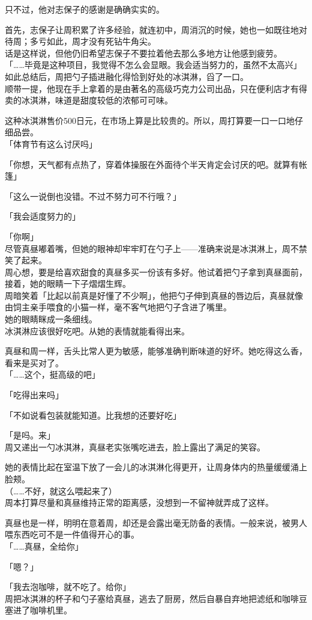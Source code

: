 只不过，他对志保子的感谢是确确实实的。

首先，志保子让周积累了许多经验，就连初中，周消沉的时候，她也一如既往地对待周；多亏如此，周才没有死钻牛角尖。\\

话是这样说，但他仍旧希望志保子不要拉着他去那么多地方让他感到疲劳。\\

「……毕竟是这种项目，我觉得不怎么会显眼。我会适当努力的，虽然不太高兴」\\

如此总结后，周把勺子插进融化得恰到好处的冰淇淋，舀了一口。\\

顺带一提，他现在手上拿着的是由著名的高级巧克力公司出品，只在便利店才有得卖的冰淇淋，味道是甜度较低的浓郁可可味。

这种冰淇淋售价500日元，在市场上算是比较贵的。所以，周打算要一口一口地仔细品尝。\\

「体育节有这么讨厌吗」

「你想，天气都有点热了，穿着体操服在外面待个半天肯定会讨厌的吧。就算有帐篷」

「这么一说倒也没错。不过不努力可不行哦？」

「我会适度努力的」

「你啊」\\

尽管真昼嘟着嘴，但她的眼神却牢牢盯在勺子上——准确来说是冰淇淋上，周不禁笑了起来。\\

周心想，要是给喜欢甜食的真昼多买一份该有多好。他试着把勺子拿到真昼面前，接着，她的眼睛一下子熠熠生辉。\\

周暗笑着「比起以前真是好懂了不少啊」，他把勺子伸到真昼的唇边后，真昼就像由饲主亲手喂食的小猫一样，毫不客气地把勺子含进了嘴里。\\

她的眼睛眯成一条细线。\\

冰淇淋应该很好吃吧。从她的表情就能看得出来。

真昼和周一样，舌头比常人更为敏感，能够准确判断味道的好坏。她吃得这么香，看来是买对了。\\

「……这个，挺高级的吧」

「吃得出来吗」

「不如说看包装就能知道。比我想的还要好吃」

「是吗。来」\\

周又递出一勺冰淇淋，真昼老实张嘴吃进去，脸上露出了满足的笑容。

她的表情比起在室温下放了一会儿的冰淇淋化得更开，让周身体内的热量缓缓涌上脸颊。\\

（……不好，就这么喂起来了）\\

周本打算尽量和真昼维持正常的距离感，没想到一不留神就弄成了这样。

真昼也是一样，明明在意着周，却还是会露出毫无防备的表情。一般来说，被男人喂东西吃可不是一件值得开心的事。\\

「……真昼，全给你」

「嗯？」

「我去泡咖啡，就不吃了。给你」\\

周把冰淇淋的杯子和勺子塞给真昼，逃去了厨房，然后自暴自弃地把滤纸和咖啡豆塞进了咖啡机里。
